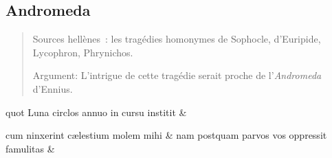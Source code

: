 \documentclass[12pt,onecolumn,twoside,a4paper]{memoir}
\begin{document}
               \subsection*{Andromeda}
               \begin{abstract}
                   Sources hellènes : les tragédies homonymes de Sophocle, d'Euripide, Lycophron,
                     Phrynichos.\par
                   Argument: L'intrigue de cette tragédie serait proche de
                        l'\textit{Andromeda} d’Ennius.\par
               \end{abstract}
               \begin{pairs}
                  \begin{Leftside}
			\beginnumbering
			\setcounter{stanzaL}{0}
                     
                         \stanza {}
                     
                              quot
                              Luna
                              circlos
                              annuo
                              in
                              cursu
                              institit \&
                         \stanza {}
                     
                              cum
                              ninxerint
                              cælestium
                              molem
                              mihi \&
                         \stanza {}
                     nam
                              postquam
                              parvos
                              vos
                              oppressit
                              famulitas \&
                         \stanza {}
                     

\end{Leftside}
\end{pairs}
\end{document}
